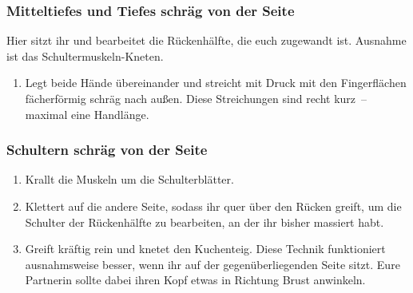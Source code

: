 \begin{oframed}
  \subsubsection{Mitteltiefes und Tiefes schräg von der Seite}

  Hier sitzt ihr  und bearbeitet die Rückenhälfte, die euch zugewandt ist. Ausnahme ist das Schultermuskeln-Kneten.

  \begin{enumerate}
    \item {} Legt beide Hände übereinander und streicht mit Druck mit den Fingerflächen fächerförmig schräg nach außen. Diese Streichungen sind recht kurz~-- maximal eine Handlänge.
    \iftoggle{oel}{
      \item \fett{Daumenstreichungen:} Streicht mit beiden Daumen fächerförmig mit viel Druck nach außen. Die Daumen zeigen dabei in Richtung des Kopfes. Diese Streichungen sind sehr kurz~-- etwa eine halbe Handlänge. Achtung, manchen Menschen ist diese Technik zu intensiv.
    }{
      \item \fett{Daumendruck:} Drückt mit den Daumenspitzen punktuell zwischen den Schulterblättern auf die Muskeln. Achtung, manchen Menschen ist diese Technik zu intensiv.
    }
  \end{enumerate}

  \subsubsection{Schultern schräg von der Seite}

  \begin{enumerate}
    \item {} Krallt die Muskeln um die Schulterblätter.
    \iftoggle{long}{
      \item \fett{Zwischen Schulterblatt und Rippen:} Hebt das Schulterblatt und den Ellenbogen eurer Partnerin an und stützt diese mit einem Arm (und bei Bedarf mit eurem Knie). Massiert dann mit der Fingerspitzen mit viel Druck unter dem Schulterblatt entlang.
    }{}
    \item {} Klettert auf die andere Seite, sodass ihr quer über den Rücken greift, um die Schulter der Rückenhälfte zu bearbeiten, an der ihr bisher massiert habt.
    \item {} Greift kräftig rein und knetet den Kuchenteig. Diese Technik funktioniert ausnahmsweise besser, wenn ihr auf der gegenüberliegenden Seite sitzt. Eure Partnerin sollte dabei ihren Kopf etwas in Richtung Brust anwinkeln.
  \end{enumerate}
\end{oframed}

